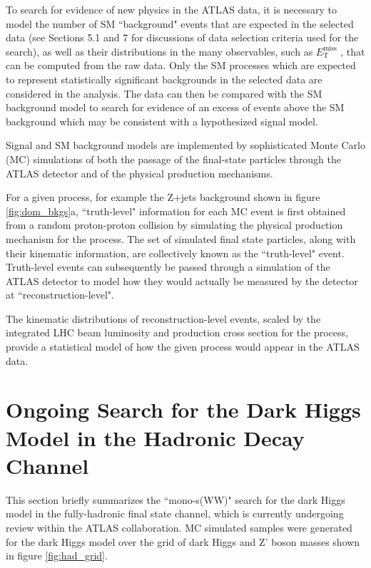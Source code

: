 \documentclass[12pt]{article}
\newcommand*{\met}{\ensuremath{E_\text{T}^\text{miss}} }
\begin{document}
To search for evidence of new physics in the ATLAS data, it is necessary to model the number of SM ``background" events that are expected in the selected data (see Sections 5.1 and 7 for discussions of data selection criteria used for the search), as well as their distributions in the many observables, such as \met, that can be computed from the raw data. Only the SM processes which are expected to represent statistically significant backgrounds in the selected data are considered in the analysis. The data can then be compared with the SM background model to search for evidence of an excess of events above the SM background which may be consistent with a hypothesized signal model.

Signal and SM background models are implemented by sophisticated Monte Carlo (MC) simulations of both the passage of the final-state particles through the ATLAS detector and of the physical production mechanisms. 

For a given process, for example the Z+jets background shown in figure \ref{fig:dom_bkgs}a, ``truth-level" information for each MC event is first obtained from a random proton-proton collision by simulating the physical production mechanism for the process. The set of simulated final state particles, along with their kinematic information, are collectively known as the ``truth-level" event. Truth-level events can subsequently be passed through a simulation of the ATLAS detector to model how they would actually be measured by the detector at ``reconstruction-level". 

The kinematic distributions of reconstruction-level events, scaled by the integrated LHC beam luminosity and production cross section for the process, provide a statistical model of how the given process would appear in the ATLAS data.

\section{Ongoing Search for the Dark Higgs Model in the Hadronic Decay Channel}

This section briefly summarizes the ``mono-s(WW)" search for the dark Higgs model in the fully-hadronic final state channel, which is currently undergoing review within the ATLAS collaboration. MC simulated samples were generated for the dark Higgs model over the grid of dark Higgs and Z' boson masses shown in figure \ref{fig:had_grid}. 
\end{document}
